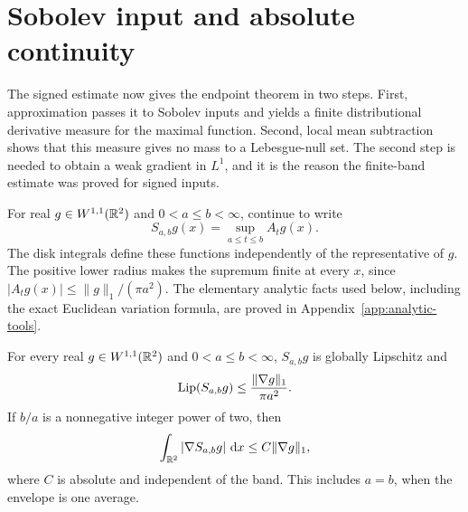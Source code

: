\section{Sobolev input and absolute continuity}\label{sec:extension}

The signed estimate now gives the endpoint theorem in two steps.
First, approximation passes it to Sobolev inputs and yields a finite
distributional derivative measure for the maximal function. Second,
local mean subtraction shows that this measure gives no mass to a
Lebesgue-null set. The second step is needed to obtain a weak gradient
in $L^1$, and it is the reason the finite-band estimate was proved
for signed inputs.

For real $g\in W^{1,1}(\mathbb R^2)$ and $0<a\le b<\infty$, continue to write
\[
 S_{a,b}g(x)=\sup_{a\le t\le b}A_tg(x).
\]
The disk integrals define these functions independently of the
representative of $g$. The positive lower radius makes the supremum
finite at every $x$, since $|A_tg(x)|\le\|g\|_1/(\pi a^2)$.
The elementary analytic facts used below, including the exact
Euclidean variation formula, are proved in
Appendix~\ref{app:analytic-tools}.

\begin{lemma}\label{lem:sobolev-band}
For every real $g\in W^{1,1}(\mathbb R^2)$ and $0<a\le b<\infty$,
$S_{a,b}g$ is globally Lipschitz and
\begin{equation}\label{eq:band-lipschitz}
 \operatorname{Lip}(S_{a,b}g)\le\frac{\|\nabla g\|_1}{\pi a^2}.
\end{equation}
If $b/a$ is a nonnegative integer power of two, then
\begin{equation}\label{eq:sobolev-band}
 \int_{\mathbb R^2}|\nabla S_{a,b}g|\,\mathop{}\!\mathrm{d} x\le C\|\nabla g\|_1,
\end{equation}
where $C$ is absolute and independent of the band. This includes
$a=b$, when the envelope is one average.
\end{lemma}

